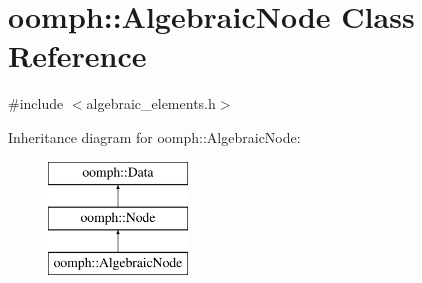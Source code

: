 \hypertarget{classoomph_1_1AlgebraicNode}{}\section{oomph\+:\+:Algebraic\+Node Class Reference}
\label{classoomph_1_1AlgebraicNode}


{\ttfamily \#include $<$algebraic\+\_\+elements.\+h$>$}

Inheritance diagram for oomph\+:\+:Algebraic\+Node\+:\begin{figure}[H]
\begin{center}
\leavevmode
\includegraphics[height=3.000000cm]{classoomph_1_1AlgebraicNode}
\end{center}
\end{figure}
